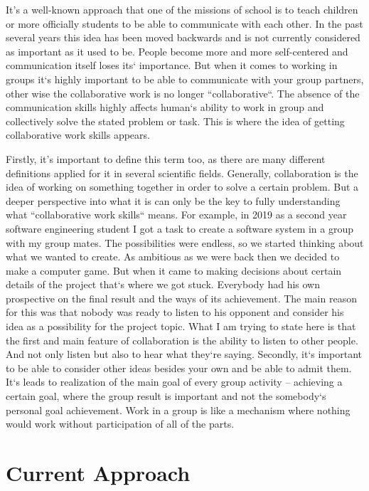 \documentclass[10pt,oneside,english,a4paper]{article}
\begin{document}
It’s a well-known approach that one of the missions of school is to teach children or more officially students to be able to communicate with each other. In the past several years this idea has been moved backwards and is not currently considered as important as it used to be. People become more and more self-centered and communication itself loses its` importance. But when it comes to working in groups it`s highly important to be able to communicate with your group partners, other wise the collaborative work is no longer ``collaborative``. The absence of the communication skills highly affects human`s ability to work in group and collectively solve the stated problem or task. This is where the idea of getting collaborative work skills appears.\par
Firstly, it’s important to define this term too, as there are many different definitions applied for it in several scientific fields. Generally, collaboration is the idea of working on something together in order to solve a certain problem. But a deeper perspective into what it is can only be the key to fully understanding what ``collaborative work skills`` means. For example, in 2019 as a second year software engineering student I got a task to create a software system in a group with my group mates. The possibilities were endless, so we started thinking about what we wanted to create. As ambitious as we were back then we decided to make a computer game. But when it came to making decisions about certain details of the project that`s where we got stuck. Everybody had his own prospective on the final result and the ways of its achievement. The main reason for this was that nobody was ready to listen to his opponent and consider his idea as a possibility for the project topic. What I am trying to state here is that the first and main feature of collaboration is the ability to listen to other people. And not only listen but also to hear what they`re saying. Secondly, it`s important to be able to consider other ideas besides your own and be able to admit them. It`s leads to realization of the main goal of every group activity – achieving a certain goal, where the group result is important and not the somebody`s personal goal achievement. Work in a group is like a mechanism where nothing would work without participation of all of the parts.

\section{Current Approach} \label{curr}
\end{document}
